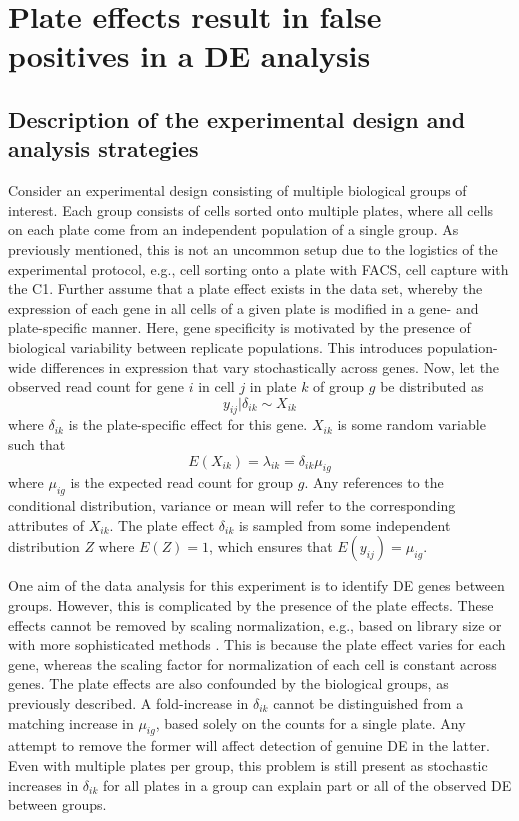 \documentclass[oupdraft]{bio}
\begin{document}
\section{Plate effects result in false positives in a DE analysis}

\subsection{Description of the experimental design and analysis strategies}
Consider an experimental design consisting of multiple biological groups of interest.
Each group consists of cells sorted onto multiple plates, where all cells on each plate come from an independent population of a single group.
As previously mentioned, this is not an uncommon setup due to the logistics of the experimental protocol, e.g., cell sorting onto a plate with FACS, cell capture with the C1.
Further assume that a plate effect exists in the data set, whereby the expression of each gene in all cells of a given plate is modified in a gene- and plate-specific manner.
Here, gene specificity is motivated by the presence of biological variability between replicate populations.
This introduces population-wide differences in expression that vary stochastically across genes.
Now, let the observed read count for gene $i$ in cell $j$ in plate $k$ of group $g$ be distributed as 
\[
    y_{ij} | \delta_{ik}  \sim X_{ik}
\]
where $\delta_{ik}$ is the plate-specific effect for this gene.
$X_{ik}$ is some random variable such that 
\[
    E(X_{ik}) = \lambda_{ik} = \delta_{ik}\mu_{ig}
\]
where $\mu_{ig}$ is the expected read count for group $g$. 
Any references to the conditional distribution, variance or mean will refer to the corresponding attributes of $X_{ik}$.
The plate effect $\delta_{ik}$ is sampled from some independent distribution $Z$ where $E(Z) = 1$, which ensures that $E(y_{ij}) = \mu_{ig}$.


One aim of the data analysis for this experiment is to identify DE genes between groups.
However, this is complicated by the presence of the plate effects.
These effects cannot be removed by scaling normalization, e.g., based on library size or with more sophisticated methods \citep{anders2010differential,robinson2010scaling}.
This is because the plate effect varies for each gene, whereas the scaling factor for normalization of each cell is constant across genes.
The plate effects are also confounded by the biological groups, as previously described.
A fold-increase in $\delta_{ik}$ cannot be distinguished from a matching increase in $\mu_{ig}$, based solely on the counts for a single plate.
Any attempt to remove the former will affect detection of genuine DE in the latter.
Even with multiple plates per group, this problem is still present as stochastic increases in $\delta_{ik}$ for all plates in a group can explain part or all of the observed DE between groups.
\end{document}
